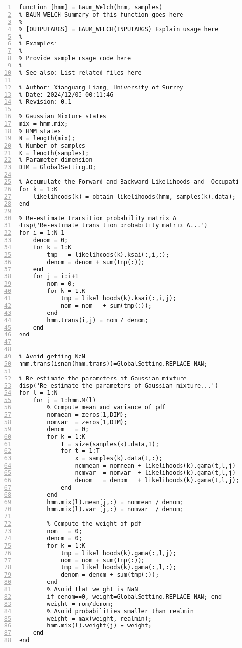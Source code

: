 \documentclass{article}
\begin{document}
\begin{lstlisting}[frame=single, numbers=left, style=Matlab-editor, caption={shared\_feature\_extraction.mlx}, label={lst:shared_feature_extraction}]
\end{lstlisting}

\begin{lstlisting}[frame=single, numbers=left, style=Matlab-editor, caption={Baum\_Welch.m}, label={lst:Baum_Welch}]
  function [hmm] = Baum_Welch(hmm, samples)
% BAUM_WELCH Summary of this function goes here
%
% [OUTPUTARGS] = BAUM_WELCH(INPUTARGS) Explain usage here
%
% Examples:
%
% Provide sample usage code here
%
% See also: List related files here

% Author: Xiaoguang Liang, University of Surrey
% Date: 2024/12/03 00:11:46
% Revision: 0.1

% Gaussian Mixture states
mix = hmm.mix;
% HMM states
N = length(mix);
% Number of samples
K = length(samples);
% Parameter dimension
DIM = GlobalSetting.D;

% Accumulate the Forward and Backward Likelihoods and  Occupation Likelihoods.
for k = 1:K
    likelihoods(k) = obtain_likelihoods(hmm, samples(k).data);
end

% Re-estimate transition probability matrix A 
disp('Re-estimate transition probability matrix A...')
for i = 1:N-1
    denom = 0;
    for k = 1:K
        tmp   = likelihoods(k).ksai(:,i,:);
        denom = denom + sum(tmp(:));
    end
    for j = i:i+1
        nom = 0;
        for k = 1:K
            tmp = likelihoods(k).ksai(:,i,j);
            nom = nom   + sum(tmp(:));
        end
        hmm.trans(i,j) = nom / denom;
    end
end


% Avoid getting NaN
hmm.trans(isnan(hmm.trans))=GlobalSetting.REPLACE_NAN;

% Re-estimate the parameters of Gaussian mixture
disp('Re-estimate the parameters of Gaussian mixture...')
for l = 1:N
    for j = 1:hmm.M(l)
        % Compute mean and variance of pdf
        nommean = zeros(1,DIM);
        nomvar  = zeros(1,DIM);
        denom   = 0;
        for k = 1:K
            T = size(samples(k).data,1);
            for t = 1:T
                x = samples(k).data(t,:);
                nommean = nommean + likelihoods(k).gama(t,l,j) * x;
                nomvar  = nomvar  + likelihoods(k).gama(t,l,j) * (x-mix(l).mean(j,:)).^2;
                denom   = denom   + likelihoods(k).gama(t,l,j);
            end
        end
        hmm.mix(l).mean(j,:) = nommean / denom;
        hmm.mix(l).var (j,:) = nomvar  / denom;

        % Compute the weight of pdf
        nom   = 0;
        denom = 0;
        for k = 1:K
            tmp = likelihoods(k).gama(:,l,j);
            nom = nom + sum(tmp(:));
            tmp = likelihoods(k).gama(:,l,:);
            denom = denom + sum(tmp(:));
        end
        % Avoid that weight is NaN
        if denom==0, weight=GlobalSetting.REPLACE_NAN; end
        weight = nom/denom;
        % Avoid probabilities smaller than realmin
        weight = max(weight, realmin); 
        hmm.mix(l).weight(j) = weight;
    end
end

\end{lstlisting}
\end{document}
